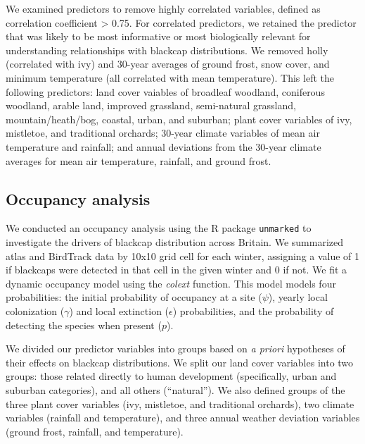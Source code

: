 \documentclass[a4paper, nobind]{templates/ociamthesis}
\begin{document}
We examined predictors to remove highly correlated variables, defined as correlation coefficient \textgreater{} 0.75. For correlated predictors, we retained the predictor that was likely to be most informative or most biologically relevant for understanding relationships with blackcap distributions. We removed holly (correlated with ivy) and 30-year averages of ground frost, snow cover, and minimum temperature (all correlated with mean temperature). This left the following predictors: land cover vaiables of broadleaf woodland, coniferous woodland, arable land, improved grassland, semi-natural grassland, mountain/heath/bog, coastal, urban, and suburban; plant cover variables of ivy, mistletoe, and traditional orchards; 30-year climate variables of mean air temperature and rainfall; and annual deviations from the 30-year climate averages for mean air temperature, rainfall, and ground frost.

\hypertarget{occupancy-analysis}{%
\subsection{Occupancy analysis}\label{occupancy-analysis}}

We conducted an occupancy analysis using the R package \texttt{unmarked} \autocite{fiskeUnmarkedPackageFitting2011} to investigate the drivers of blackcap distribution across Britain. We summarized atlas and BirdTrack data by 10x10 grid cell for each winter, assigning a value of 1 if blackcaps were detected in that cell in the given winter and 0 if not. We fit a dynamic occupancy model \autocite{mackenzieEstimatingSiteOccupancy2003} using the \emph{colext} function. This model models four probabilities: the initial probability of occupancy at a site (\(\psi\)), yearly local colonization (\(\gamma\)) and local extinction (\(\epsilon\)) probabilities, and the probability of detecting the species when present (\(p\)).

We divided our predictor variables into groups based on \emph{a priori} hypotheses of their effects on blackcap distributions. We split our land cover variables into two groups: those related directly to human development (specifically, urban and suburban categories), and all others (``natural''). We also defined groups of the three plant cover variables (ivy, mistletoe, and traditional orchards), two climate variables (rainfall and temperature), and three annual weather deviation variables (ground frost, rainfall, and temperature).
\end{document}

